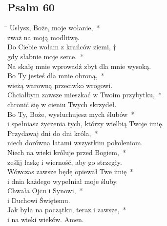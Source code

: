 \subsection*{Psalm 60}
\begin{tabbing}
\hspace{4mm} \= \>\kill
Usłysz, Boże, moje wołanie,~*\\
zważ na moją modlitwę.\\
\>Do Ciebie wołam z krańców ziemi, †\\
\>gdy słabnie moje serce.~*\\
\>Na skałę mnie wprowadź zbyt dla mnie wysoką.\\
Bo Ty jesteś dla mnie obroną,~*\\
wieżą warowną przeciwko wrogowi.\\
\>Chciałbym zawsze mieszkać w Twoim przybytku,~*\\
\>chronić się w cieniu Twych skrzydeł.\\
Bo Ty, Boże, wysłuchujesz mych ślubów~*\\
i spełniasz życzenia tych, którzy wielbią Twoje imię.\\
\>Przydawaj dni do dni króla,~*\\
\>niech dorówna latami wszystkim pokoleniom.\\
Niech na wieki króluje przed Bogiem,~*\\
ześlij łaskę i wierność, aby go strzegły.\\
\>Wówczas zawsze będę opiewał Twe imię~*\\
\>i dnia każdego wypełniał moje śluby.\\
Chwała Ojcu i Synowi,~*\\
i Duchowi Świętemu.\\
\>Jak była na początku, teraz i zawsze,~*\\
\>i na wieki wieków. Amen.
\end{tabbing}